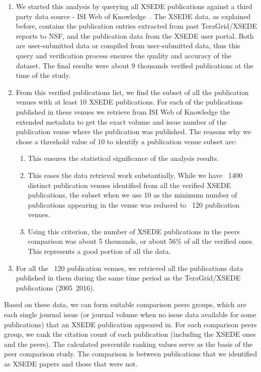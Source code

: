 \documentclass{sig-alternate}
\begin{document}
\begin{enumerate}
\item We started this analysis by querying all XSEDE publications
  against a third party data source - ISI Web of
  Knowledge~\cite{www-isiwos}. The XSEDE data, as explained before,
  contains the publication entries extracted from past TeraGrid/XSEDE
  reports to NSF, and the publication data from the XSEDE user
  portal. Both are user-submitted data or compiled from user-submitted
  data, thus this query and verification process ensures the quality
  and accuracy of the dataset.  The final results were about 9
  thousands verified publications at the time of the study.

\item From this verified publications list, we find the subset of all
  the publication venues with at least 10 XSEDE publications. For each
  of the publications published in these venues we retrieve from ISI
  Web of Knowledge the extended metadata to get the exact volume and
  issue number of the publication venue where the publication was
  published. The reasons why we chose a threshold value of 10 to
  identify a publication venue subset are:
\begin{enumerate}
\item This ensures the statistical significance of the analysis
  results.
\item This eases the data retrieval work substantially. While we have
  ~1400 distinct publication venues identified from all the verified
  XSEDE publications, the subset when we use 10 as the minimum number
  of publications appearing in the venue was reduced to ~120
  publication venues.
\item Using this criterion, the number of XSEDE publications in the
  peers comparison was about 5 thousands, or about 56\% of all the
  verified ones. This represents a good portion of all the data.
\end{enumerate}

\item For all the ~120 publication venues, we retrieved all the
  publications data published in them during the same time period as
  the TeraGrid/XSEDE publications (2005~2016).
\end{enumerate}

Based on these data, we can form suitable comparison peers groups,
which are each single journal issue (or journal volume when no issue
data available for some publications) that an XSEDE publication
appeared in. For each comparison peers group, we rank the citation
count of each publication (including the XSEDE ones and the
peers). The calculated percentile ranking values serve as the basis of
the peer comparison study. The comparison is between publications that
we identified as XSEDE papers and those that were not.
\end{document}
